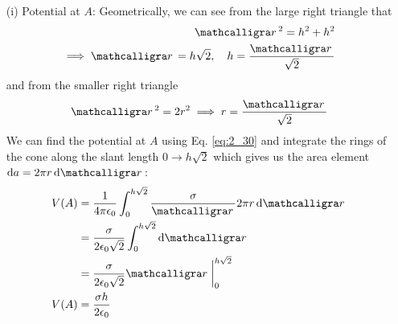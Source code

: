 \documentclass[../main.tex]{subfiles}
\begin{document}
\begin{itemize}
    \item [(i)] Potential at $A$: Geometrically, we can see from the large right triangle that
    \begin{align*}
        \scriptr^2 = h^2 + h^2 \\
        \implies \scriptr = h\sqrt{2}, \quad h = \frac{\scriptr}{\sqrt{2}}
    \end{align*}
    and from the smaller right triangle
    \begin{align*}
        \scriptr^2 = 2r^2 \implies r = \frac{\scriptr}{\sqrt{2}}
    \end{align*}
    We can find the potential at $A$ using Eq. \eqref{eq:2_30} and integrate the rings of the cone along the slant length $0 \to h\sqrt{2}$
    which gives us the area element $\dd{a} = 2\pi r \dd{\scriptr}$:
    \begin{align*}
        V(A) &= \ke \int_0^{h\sqrt{2}} \frac{\sigma}{\scriptr} 2\pi r \dd{\scriptr} \\
        &= \frac{\sigma}{2\epsilon_0\sqrt{2}} \int_0^{h\sqrt{2}} \dd{\scriptr} \\
        &= \frac{\sigma}{2\epsilon_0\sqrt{2}} \scriptr \eval_0^{h\sqrt{2}} \\
        V(A) &= \frac{\sigma h}{2\epsilon_0}
    \end{align*}


\end{itemize}
\end{document}
